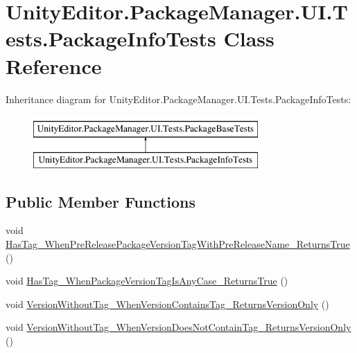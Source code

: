 \hypertarget{class_unity_editor_1_1_package_manager_1_1_u_i_1_1_tests_1_1_package_info_tests}{}\section{Unity\+Editor.\+Package\+Manager.\+U\+I.\+Tests.\+Package\+Info\+Tests Class Reference}
\label{class_unity_editor_1_1_package_manager_1_1_u_i_1_1_tests_1_1_package_info_tests}
Inheritance diagram for Unity\+Editor.\+Package\+Manager.\+U\+I.\+Tests.\+Package\+Info\+Tests\+:\begin{figure}[H]
\begin{center}
\leavevmode
\includegraphics[height=2.000000cm]{class_unity_editor_1_1_package_manager_1_1_u_i_1_1_tests_1_1_package_info_tests}
\end{center}
\end{figure}
\subsection*{Public Member Functions}
\begin{DoxyCompactItemize}
\item 
void \mbox{\hyperlink{class_unity_editor_1_1_package_manager_1_1_u_i_1_1_tests_1_1_package_info_tests_a84b01797365ad463dac19a1cb3356903}{Has\+Tag\+\_\+\+When\+Pre\+Release\+Package\+Version\+Tag\+With\+Pre\+Release\+Name\+\_\+\+Returns\+True}} ()
\item 
void \mbox{\hyperlink{class_unity_editor_1_1_package_manager_1_1_u_i_1_1_tests_1_1_package_info_tests_aaa396d54bb8a5b55287b451fcd9e51b8}{Has\+Tag\+\_\+\+When\+Package\+Version\+Tag\+Is\+Any\+Case\+\_\+\+Returns\+True}} ()
\item 
void \mbox{\hyperlink{class_unity_editor_1_1_package_manager_1_1_u_i_1_1_tests_1_1_package_info_tests_a8e9922b0e4de3dc19a58467bddeccffe}{Version\+Without\+Tag\+\_\+\+When\+Version\+Contains\+Tag\+\_\+\+Returns\+Version\+Only}} ()
\item 
void \mbox{\hyperlink{class_unity_editor_1_1_package_manager_1_1_u_i_1_1_tests_1_1_package_info_tests_a878123d92e4ea0b9791f2e1801c2d9c4}{Version\+Without\+Tag\+\_\+\+When\+Version\+Does\+Not\+Contain\+Tag\+\_\+\+Returns\+Version\+Only}} ()
\end{DoxyCompactItemize}
